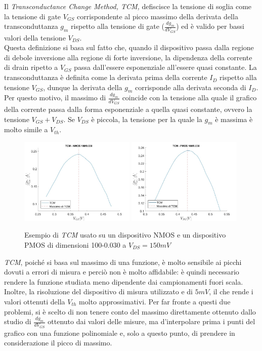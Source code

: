 \documentclass[12pt, letterpaper]{book}
\begin{document}
Il
\emph{Transconductance Change Method, TCM,} defiscisce la tensione di soglia come la tensione di gate $V_{GS}$ corrispondente al picco massimo
della derivata della transconduttanza $g_m$ rispetto alla tensione di gate
($\frac{dg_m}{dV_ {GS}}$) ed è valido per bassi valori della tensione $V_{DS}$.\\
Questa definizione si basa sul fatto che, quando il dispositivo passa dalla regione di debole inversione alla regione di forte inversione, la dipendenza della corrente di drain ripetto a $V_{GS}$ passa dall'essere esponenziale all'essere quasi constante.
La transconduttanza è definita come la derivata prima della corrente $I_D$ rispetto alla tensione $V_{GS}$, dunque la derivata della $g_m$ corrisponde alla derivata seconda di $I_D$. Per questo motivo, il massimo di $\frac{dg_m}{dV_{GS}}$ coincide con la tensione alla quale il grafico della corrente passa dalla forma esponenziale a quella quasi constante, ovvero la tensione $V_{GS}+V_{DS}$. Se $V_{DS}$ è piccola, la tensione per la quale la $g_m$ è massima è molto simile a $V_{th}$.\\

\begin{figure}[h!]
  \centering
  \includegraphics[width=0.49\textwidth]{TCM-N4-100-30-NoFit}
  \includegraphics[width=0.49\textwidth]{TCM-P1-100-30-NoFit}
  \caption{Esempio di \emph{TCM} usato su un dispositivo NMOS e un dispositivo PMOS di dimensioni 100-0.030 a $V_{DS} = 150 mV$}
\end{figure}

\emph{TCM},
poiché si basa sul massimo di una funzione, è molto sensibile ai picchi dovuti a errori di misura e perciò non è molto affidabile:
è quindi necessario rendere la funzione studiata meno dipendente dai campionamenti fuori scala. Inoltre, la risoluzione del dispositivo di misura utilizzato e di $5 mV$, il che rende i valori ottenuti della $V_{th}$ molto approssimativi.
Per far fronte a questi due problemi, si è scelto di non tenere conto del massimo direttamente ottenuto dallo studio di $\frac{dg_m}{dV_{GS}}$ ottenuto dai valori delle misure, ma d'interpolare prima i punti del grafico con una funzione polinomiale e, solo a questo punto, di prendere in considerazione il picco di massimo. \\
\end{document}
